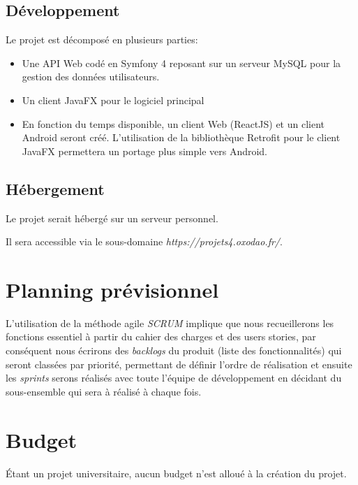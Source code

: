 \documentclass[oneside]{report}
\begin{document}
	\section{Développement}
	{
		\par Le projet est décomposé en plusieurs parties:
		\begin{itemize}
			\item \par Une API Web codé en Symfony 4 reposant sur un serveur MySQL pour la gestion des données utilisateurs.\\
			\item \par Un client JavaFX pour le logiciel principal\\
			\item \par En fonction du temps disponible, un client Web (ReactJS) et un client Android seront créé. L'utilisation de la bibliothèque Retrofit pour le client JavaFX permettera un portage plus simple vers Android.
		\end{itemize}
	}

	\section{Hébergement}
	{
		\par Le projet serait hébergé sur un serveur personnel.
		\par Il sera accessible via le sous-domaine \textit{https://projets4.oxodao.fr/}.
	}

	\chapter{Planning prévisionnel}
	\par L'utilisation de la méthode agile \textit{SCRUM} implique que nous recueillerons les fonctions essentiel à partir du cahier des charges et des users stories, par conséquent nous écrirons des \textit{backlogs} du produit (liste des fonctionnalités) qui seront classées par priorité, permettant de définir l'ordre de réalisation et ensuite les \textit{sprints} serons réalisés avec toute l'équipe de développement en décidant du sous-ensemble qui sera à réalisé à chaque fois.

	\chapter{Budget}
	\par Étant un projet universitaire, aucun budget n'est alloué à la création du projet.
\end{document}
